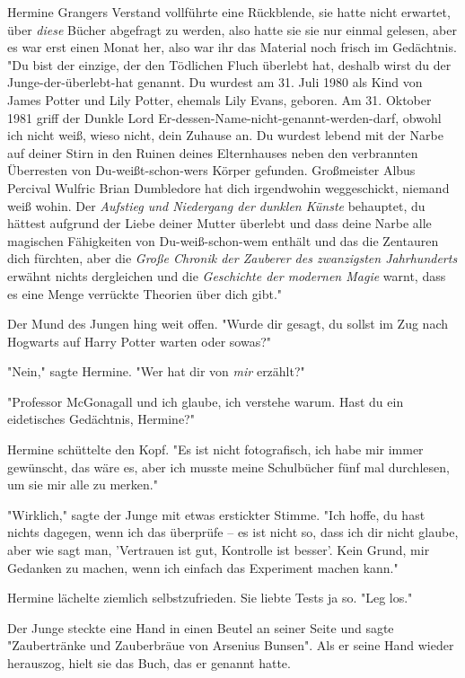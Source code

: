 {Hermine Grangers Verstand vollführte eine Rückblende, sie hatte nicht erwartet, über \emph{diese} Bücher abgefragt zu werden, also hatte sie sie nur einmal gelesen, aber es war erst einen Monat her, also war ihr das Material noch frisch im Gedächtnis. "Du bist der einzige, der den Tödlichen Fluch überlebt hat, deshalb wirst du der Junge-der-überlebt-hat genannt. Du wurdest am 31. Juli 1980 als Kind von James Potter und Lily Potter, ehemals Lily Evans, geboren. Am 31. Oktober 1981 griff der Dunkle Lord Er-dessen-Name-nicht-genannt-werden-darf, obwohl ich nicht weiß, wieso nicht, dein Zuhause an. Du wurdest lebend mit der Narbe auf deiner Stirn in den Ruinen deines Elternhauses neben den verbrannten Überresten von Du-weißt-schon-wers Körper gefunden. Großmeister Albus Percival Wulfric Brian Dumbledore hat dich irgendwohin weggeschickt, niemand weiß wohin. Der \emph{Aufstieg und Niedergang der dunklen Künste} behauptet, du hättest aufgrund der Liebe deiner Mutter überlebt und dass deine Narbe alle magischen Fähigkeiten von Du-weiß-schon-wem enthält und das die Zentauren dich fürchten, aber die \emph{Große Chronik der Zauberer des zwanzigsten Jahrhunderts} erwähnt nichts dergleichen und die \emph{Geschichte der modernen Magie} warnt, dass es eine Menge verrückte Theorien über dich gibt."

Der Mund des Jungen hing weit offen. "Wurde dir gesagt, du sollst im Zug nach Hogwarts auf Harry Potter warten oder sowas?"

"Nein," sagte Hermine. "Wer hat dir von \emph{mir} erzählt?"

"Professor McGonagall und ich glaube, ich verstehe warum. Hast du ein eidetisches Gedächtnis, Hermine?"

Hermine schüttelte den Kopf. "Es ist nicht fotografisch, ich habe mir immer gewünscht, das wäre es, aber ich musste meine Schulbücher fünf mal durchlesen, um sie mir alle zu merken."

"Wirklich," sagte der Junge mit etwas erstickter Stimme. "Ich hoffe, du hast nichts dagegen, wenn ich das überprüfe -- es ist nicht so, dass ich dir nicht glaube, aber wie sagt man, 'Vertrauen ist gut, Kontrolle ist besser'. Kein Grund, mir Gedanken zu machen, wenn ich einfach das Experiment machen kann."

Hermine lächelte ziemlich selbstzufrieden. Sie liebte Tests ja so. "Leg los."

Der Junge steckte eine Hand in einen Beutel an seiner Seite und sagte "Zaubertränke und Zauberbräue von Arsenius Bunsen". Als er seine Hand wieder herauszog, hielt sie das Buch, das er genannt hatte.

}
